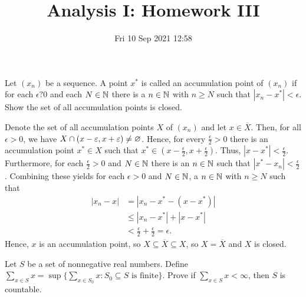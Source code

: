 \documentclass[a4paper]{article}
\title{Analysis I: Homework III}
\date{Fri 10 Sep 2021 12:58}
\begin{document}
\maketitle
\begin{problem}[14]
	Let \(\left( x_{n} \right) \)	 be a sequence. A point \(x^{*}\) is called an accumulation point of \(\left( x_{n} \right) \) if for each \(\epsilon ? 0\) and each \(N \in \mathbb{N}\) there is a \(n \in \mathbb{N}\) with \(n \ge N\) such that \(\left| x_{n} - x^{*} \right| <\epsilon \). Show the set of all accumulation points is closed.
\end{problem}
\begin{solution}
	Denote the set of all accumulation points \(X\) of \(\left( x_{n} \right) \) and let \(x \in \overline{X}\). Then, for all \(\epsilon > 0\), we have \(X \cap \left( x-\varepsilon, x+\varepsilon \right) \neq \varnothing\). Hence, for every \(\frac{\epsilon}{2} > 0\) there is an accumulation point \(x^{*}\in X\) such that \(x^{*} \in \left( x- \frac{\epsilon}{2}, x + \frac{\epsilon}{2} \right) \). Thus, \(\left| x - x^{*} \right|  < \frac{\epsilon}{2}\). Furthermore, for each \(\frac{\epsilon}{2} > 0\) and \(N \in \mathbb{N}\) there is an \(n \in \mathbb{N}\) such that \(\left| x^{*} - x_{n} \right| < \frac{\epsilon}{2} \). Combining these yields for each \(\epsilon > 0\) and \(N \in \mathbb{N}\), a \(n \in \mathbb{N}\) with \(n \ge N\) such that
	\begin{align*}
		\left| x_{n} - x\right| &= \left| x_{n} - x^{*} - \left( x - x^{*} \right)  \right|  \\
		&\le \left| x_{n} - x^{*} \right| + \left| x - x^{*} \right|   \\
		&< \frac{\epsilon}{2} + \frac{\epsilon}{2} = \epsilon
	.\end{align*}
Hence, \(x\) is an accumulation point, so \(X \subseteq \overline{X} \subseteq X\), so \(X = \overline{X}\) and \(X\) is closed.
\end{solution}
\newpage
\begin{problem}[15]
	Let \(S\) be a set of nonnegative real numbers. Define \(\sum_{x \in S}^{}x = \sup \{\sum_{x \in S_0}^{} x : S_0 \subseteq S \text{ is finite}\} \). Prove if \(\sum_{x \in S}^{}x < \infty\), then \(S\) is countable.
\end{problem}
\end{document}
